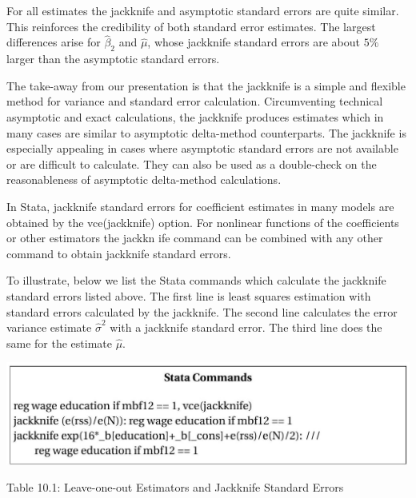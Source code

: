 \documentclass[10pt]{article}
\begin{document}
For all estimates the jackknife and asymptotic standard errors are quite similar. This reinforces the credibility of both standard error estimates. The largest differences arise for $\widehat{\beta}_{2}$ and $\widehat{\mu}$, whose jackknife standard errors are about $5 \%$ larger than the asymptotic standard errors.

The take-away from our presentation is that the jackknife is a simple and flexible method for variance and standard error calculation. Circumventing technical asymptotic and exact calculations, the jackknife produces estimates which in many cases are similar to asymptotic delta-method counterparts. The jackknife is especially appealing in cases where asymptotic standard errors are not available or are difficult to calculate. They can also be used as a double-check on the reasonableness of asymptotic delta-method calculations.

In Stata, jackknife standard errors for coefficient estimates in many models are obtained by the vce(jackknife) option. For nonlinear functions of the coefficients or other estimators the jackkn ife command can be combined with any other command to obtain jackknife standard errors.

To illustrate, below we list the Stata commands which calculate the jackknife standard errors listed above. The first line is least squares estimation with standard errors calculated by the jackknife. The second line calculates the error variance estimate $\widehat{\sigma}^{2}$ with a jackknife standard error. The third line does the same for the estimate $\widehat{\mu}$.

\includegraphics[max width=\textwidth]{2022_09_17_704b7bd5000562ad7735g-05}

Table 10.1: Leave-one-out Estimators and Jackknife Standard Errors
\end{document}
